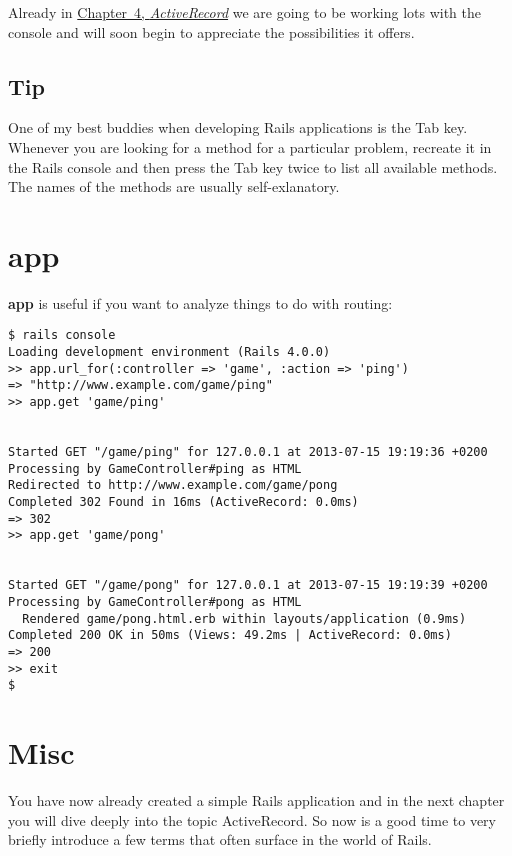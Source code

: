 \documentclass[a4paper]{book}
\begin{document}
Already in \hyperref[activerecordux5fchapter]{Chapter~4, \emph{ActiveRecord}} we are going to be working lots with the console and will soon begin to appreciate the possibilities it offers.

\subsection{Tip}\label{tip-4}

One of my best buddies when developing Rails applications is the Tab key. Whenever you are looking for a method for a particular problem, recreate it in the Rails console and then press the Tab key twice to list all available methods. The names of the methods are usually self-exlanatory.

\section{app}\label{app}

\textbf{app} is useful if you want to analyze things to do with routing:

\begin{shaded}\begin{verbatim}
$ rails console
Loading development environment (Rails 4.0.0)
>> app.url_for(:controller => 'game', :action => 'ping')
=> "http://www.example.com/game/ping"
>> app.get 'game/ping'


Started GET "/game/ping" for 127.0.0.1 at 2013-07-15 19:19:36 +0200
Processing by GameController#ping as HTML
Redirected to http://www.example.com/game/pong
Completed 302 Found in 16ms (ActiveRecord: 0.0ms)
=> 302
>> app.get 'game/pong'


Started GET "/game/pong" for 127.0.0.1 at 2013-07-15 19:19:39 +0200
Processing by GameController#pong as HTML
  Rendered game/pong.html.erb within layouts/application (0.9ms)
Completed 200 OK in 50ms (Views: 49.2ms | ActiveRecord: 0.0ms)
=> 200
>> exit
$
\end{verbatim}\end{shaded}

\section{Misc}\label{misc}

You have now already created a simple Rails application and in the next chapter you will dive deeply into the topic ActiveRecord. So now is a good time to very briefly introduce a few terms that often surface in the world of Rails.
\end{document}
